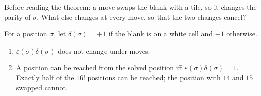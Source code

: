 \begin{think}
Before reading the theorem: a move swaps the blank with a tile, so it changes the parity of $\sigma$. What else changes at every move, so that the two changes cancel?
\end{think}

\begin{theorem}\label{thm:fifteen}
For a position $\sigma$, let $\delta(\sigma)=+1$ if the blank is on a white cell and $-1$ otherwise.
\begin{enumerate}[label=(\alph*)]
\item $\varepsilon(\sigma)\delta(\sigma)$ does not change under moves.
\item A position can be reached from the solved position iff $\varepsilon(\sigma)\delta(\sigma)=1$. Exactly half of the $16!$ positions can be reached; the position with $14$ and $15$ swapped cannot.
\end{enumerate}
\end{theorem}

